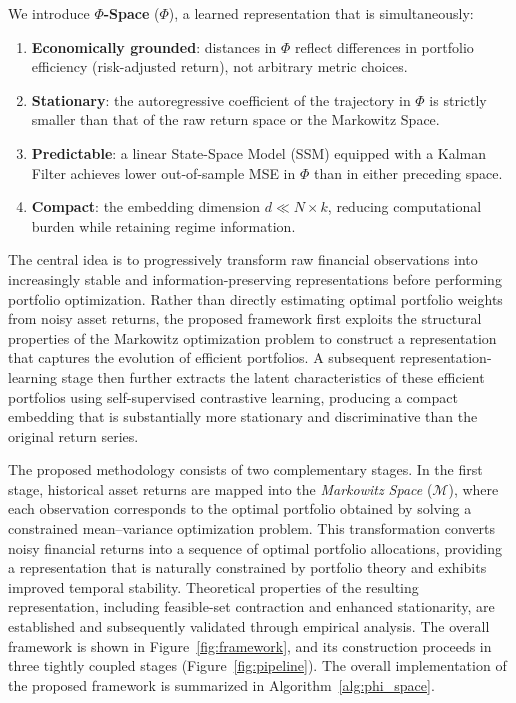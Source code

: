 \documentclass[preprint,12pt]{elsarticle}
\theoremstyle{plain}
\theoremstyle{definition}
\begin{document}
We introduce \textbf{$\Phi$-Space} ($\Phi$), a learned
representation that is simultaneously:
\begin{enumerate}
  \item \textbf{Economically grounded}: distances in $\Phi$ reflect differences in
        portfolio efficiency (risk-adjusted return), not arbitrary metric choices.
  \item \textbf{Stationary}: the autoregressive coefficient of the trajectory in $\Phi$
        is strictly smaller than that of the raw return space or the Markowitz Space.
  \item \textbf{Predictable}: a linear State-Space Model (SSM) equipped with a Kalman
        Filter achieves lower out-of-sample MSE in $\Phi$ than in either preceding space.
  \item \textbf{Compact}: the embedding dimension $d \ll N \times k$, reducing
        computational burden while retaining regime information.
\end{enumerate}

The central idea is to progressively transform raw financial observations into increasingly stable and information-preserving representations before performing portfolio optimization. Rather than directly estimating optimal portfolio weights from noisy asset returns, the proposed framework first exploits the structural properties of the Markowitz optimization problem to construct a representation that captures the evolution of efficient portfolios. A subsequent representation-learning stage then further extracts the latent characteristics of these efficient portfolios using self-supervised contrastive learning, producing a compact embedding that is substantially more stationary and discriminative than the original return series.

The proposed methodology consists of two complementary stages. In the first stage, historical asset returns are mapped into the \emph{Markowitz Space} ($\mathcal{M}$), where each observation corresponds to the optimal portfolio obtained by solving a constrained mean--variance optimization problem. This transformation converts noisy financial returns into a sequence of optimal portfolio allocations, providing a representation that is naturally constrained by portfolio theory and exhibits improved temporal stability. Theoretical properties of the resulting representation, including feasible-set contraction and enhanced stationarity, are established and subsequently validated through empirical analysis.
The overall framework is shown in Figure~\ref{fig:framework}, and its construction proceeds in three tightly coupled stages (Figure~\ref{fig:pipeline}). The overall implementation of the proposed framework is summarized in Algorithm~\ref{alg:phi_space}.
\end{document}

